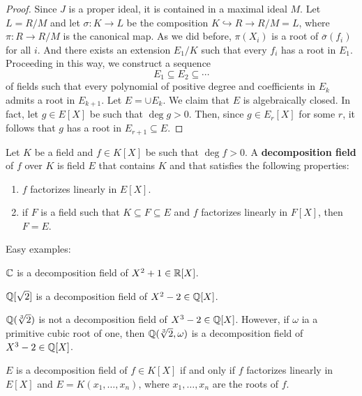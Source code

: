 \begin{proof}
    Since $J$ is a proper ideal, it is contained in a maximal ideal $M$. Let $L=R/M$ 
    and let $\sigma\colon K\to L$ be the composition $K\hookrightarrow R\to R/M=L$, 
    where $\pi\colon R\to R/M$ is the canonical map.  
    As we did before,
    $\pi(X_i)$ is a root of $\overline{\sigma}(f_i)$ for all $i$. And 
    there exists an extension $E_1/K$ such that
    every $f_i$ has a root in $E_1$. Proceeding in this way, we construct
    a sequence
    \[
    E_1\subseteq E_2\subseteq\cdots
    \]
    of fields such that every polynomial of positive degree and coefficients in $E_k$ 
    admits a root in $E_{k+1}$. Let $E=\cup E_k$. We claim that $E$ is algebraically closed. In fact, 
    let $g\in E[X]$ be such that $\deg g>0$. Then, since $g\in E_r[X]$ for some $r$, it follows
    that $g$ has a root in $E_{r+1}\subseteq E$. 
\end{proof}


\begin{definition}
	Let $K$ be a field and $f\in K[X]$ be such that $\deg f>0$. A \textbf{decomposition field}
	of $f$ over $K$ is field $E$ that contains $K$ and that satisfies the following properties:
	\begin{enumerate}
		\item $f$ factorizes linearly in $E[X]$. 
		\item if $F$ is a field such that $K\subseteq F\subseteq E$ and 
			$f$ factorizes
			linearly in $F[X]$, then $F=E$. 
	\end{enumerate}
\end{definition}

Easy examples: 

\begin{example}
	$\mathbb{C}$ is a decomposition field of $X^2+1\in\mathbb{R}[X]$. 
\end{example}

\begin{example}
	$\mathbb{Q}[\sqrt{2}]$ is a decomposition field of $X^2-2\in\mathbb{Q}[X]$. 
\end{example}

\begin{example}
	$\mathbb{Q}(\sqrt[3]{2})$ is not a decomposition field of $X^3-2\in\mathbb{Q}[X]$. However, if
	$\omega$ ia a primitive cubic root of one, then 
	$\mathbb{Q}(\sqrt[3]{2},\omega)$ is a decomposition field of $X^3-2\in\mathbb{Q}[X]$. 
\end{example}

\begin{proposition}
	$E$ is a decomposition field of $f\in K[X]$ if and only if
	$f$ factorizes linearly in $E[X]$ and $E=K(x_1,\dots,x_n)$, where 
	$x_1,\dots,x_n$ are the roots of $f$. 
\end{proposition}

